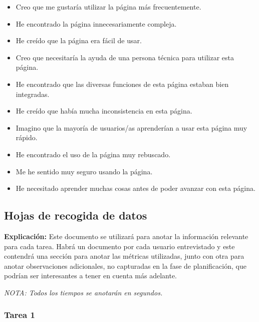 \documentclass[spanish]{article}
\begin{document}
\begin{itemize}

\item Creo que me gustaría utilizar la página más
frecuentemente.

\item He encontrado la página innecesariamente compleja.

\item He creído que la página era fácil de usar.

\item Creo que necesitaría la ayuda de una persona técnica para
utilizar esta página.

\item He encontrado que las diversas funciones de esta página
estaban bien integradas.

\item He creído que había mucha inconsistencia en esta página.

\item Imagino que la mayoría de usuarios/as aprenderían a usar
esta página muy rápido.

\item He encontrado el uso de la página muy rebuscado.

\item Me he sentido muy seguro usando la página.

\item He necesitado aprender muchas cosas antes de poder
avanzar con esta página. 

\end{itemize}

\newpage

\subsection{Hojas de recogida de datos}

\textbf{Explicación:} Este documento se utilizará para anotar la
información relevante para cada tarea. Habrá un documento
por cada usuario entrevistado y este contendrá una sección
para anotar las métricas utilizadas, junto con otra para
anotar observaciones adicionales, no capturadas en la fase
de planificación, que podrían ser interesantes a tener en cuenta
más adelante.\newline

\textit{NOTA: Todos los tiempos se anotarán en segundos.}

\subsubsection{Tarea 1}
\end{document}
